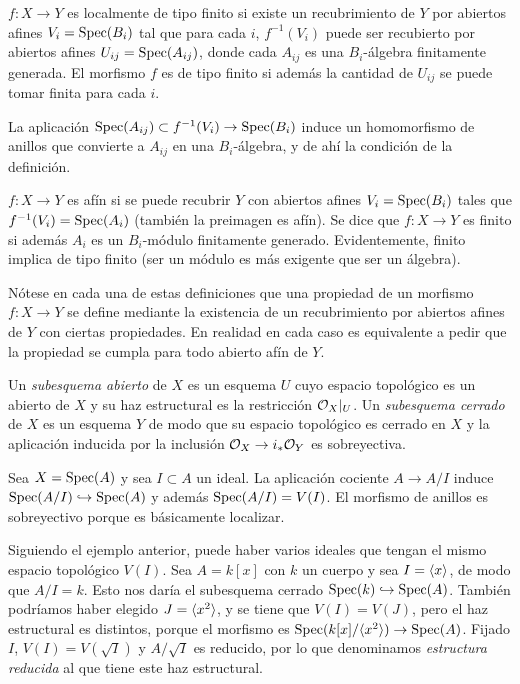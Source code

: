 \documentclass[GA.tex]{subfiles}
\begin{document}
\begin{defi}
$f:X\to Y$ es localmente de tipo finito si existe un recubrimiento de $Y$ por abiertos afines $V_i=\operatorname{Spec}(B_i)$ tal que para cada $i$, $f^{-1}(V_i)$ puede ser recubierto por abiertos afines $U_{ij}=\operatorname{Spec}(A_{ij})$, donde cada $A_{ij}$ es una $B_i$-álgebra finitamente generada. El morfismo $f$ es de tipo finito si además la cantidad de $U_{ij}$ se puede tomar finita para cada $i$. 
\end{defi}

\begin{observacion}
La aplicación $\operatorname{Spec}(A_{ij})\subset f^{-1}(V_i)\to \operatorname{Spec}(B_i)$ induce un homomorfismo de anillos que convierte a $A_{ij}$ en una $B_i$-álgebra, y de ahí la condición de la definición. 
\end{observacion}

\begin{defi}
$f:X\to Y$ es afín si se puede recubrir $Y$ con abiertos afines $V_i=\operatorname{Spec}(B_i)$ tales que $f^{-1}(V_i)=\operatorname{Spec}(A_i)$ (también la preimagen es afín). Se dice que $f:X\to Y$ es finito si además $A_i$ es un $B_i$-módulo finitamente generado. Evidentemente, finito implica de tipo finito (ser un módulo es más exigente que ser un álgebra).
\end{defi}

Nótese en cada una de estas definiciones que una propiedad de un morfismo $f:X\to Y$ se define mediante la existencia de un recubrimiento por abiertos afines de $Y$ con ciertas propiedades. En realidad en cada caso es equivalente a pedir que la propiedad se cumpla para todo abierto afín de $Y$. 


\begin{defi}
Un \emph{subesquema abierto} de $X$ es un esquema $U$ cuyo espacio topológico es un abierto de $X$ y su haz estructural es la restricción ${\mathcal O}_{X}|_{U}$. Un \emph{subesquema cerrado} de $X$ es un esquema $Y$ de modo que su espacio topológico es cerrado en $X$ y la aplicación inducida por la inclusión ${\mathcal O}_X\to i_*{\mathcal O}_Y$ es sobreyectiva.
\end{defi}

\begin{ej}
Sea $X=\operatorname{Spec}(A)$ y sea $I\subset A$ un ideal. La aplicación cociente $A\to A/I$ induce $\operatorname{Spec}(A/I)\hookrightarrow \operatorname{Spec}(A)$ y además $\operatorname{Spec}(A/I)=V(I)$. El morfismo de anillos es sobreyectivo porque es básicamente localizar. 
\end{ej}
\begin{ej}
Siguiendo el ejemplo anterior, puede haber varios ideales que tengan el mismo espacio topológico $V(I)$. Sea $A=k[x]$ con $k$ un cuerpo y sea $I=\langle{x}\rangle$, de modo que $A/I=k$. Esto nos daría el subesquema cerrado $\operatorname{Spec}(k)\hookrightarrow\operatorname{Spec}(A)$. También podríamos haber elegido $J=\langle{x^2}\rangle$, y se tiene que $V(I)=V(J)$, pero el haz estructural es distintos, porque el morfismo es $\operatorname{Spec}(k[x]/\langle{x^2}\rangle)\to \operatorname{Spec}(A)$. Fijado $I$, $V(I)=V(\sqrt{I})$ y $A/\sqrt{I}$ es reducido, por lo que denominamos \emph{estructura reducida} al que tiene este haz estructural. 
\end{ej}
\end{document}
